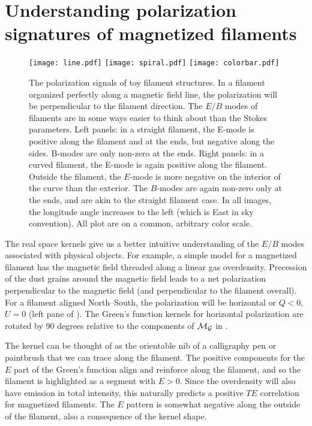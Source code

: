 \section{Understanding polarization signatures of magnetized filaments}
\label{sec:pol_filaments}
% 
\begin{figure}[t]
\texttt{[image: line.pdf]}
\texttt{[image: spiral.pdf]}
\texttt{[image: colorbar.pdf]}
\caption{ The polarization signals of toy filament structures. In a filament organized perfectly along a magnetic field line, the polarization will be perpendicular to the filament direction.  The $E/B$ modes of filaments are in some ways easier to think about than the Stokes parameters. Left panels: in a straight filament, the E-mode is positive along the filament and at the ends, but negative along the sides.  B-modes are only non-zero at the ends.  Right panels: in a curved filament, the E-mode is again positive along the filament.  Outside the filament, the $E$-mode is more negative on the interior of the curve than the exterior.  The $B$-modes are again non-zero only at the ends, and are akin to the straight filament case. In all images, the longitude angle increases to the left (which is East in sky convention).  All plot are on a common, arbitrary color scale.}
\label{fig:polfilaments}
\end{figure}
%

The real space kernels give us a better intuitive understanding of the $E/B$ modes associated with physical objects.  For example, a simple model for a magnetized filament has the magnetic field threaded along a linear gas overdensity.  Precession of the dust grains around the magnetic field leads to a net polarization perpendicular to the magnetic field (and perpendicular to the filament overall).  For a filament aligned North--South, the polarization will be horizontal or $Q<0$, $U=0$ (left pane of ).  The Green's function kernels for horizontal polarization are rotated by 90 degrees relative to the components of $\cal{M}_G$ in .

The kernel can be thought of as the orientable nib of a calligraphy pen or paintbrush that we can trace along the filament.  The positive components for the $E$ part of the Green's function align and reinforce along the filament, and so the filament is highlighted as a segment with $E>0$.  Since the overdensity will also have emission in total intensity, this naturally predicts a positive $TE$ correlation for magnetized filaments.  The $E$ pattern is somewhat negative along the outside of the filament, also a consequence of the kernel shape.

